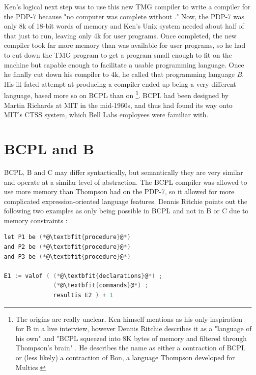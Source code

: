 Ken's logical next step was to use this new TMG compiler to
write a \ftn{} compiler for the PDP-7 because
"no computer was complete without \ftn{}."
Now, the PDP-7 was only 8k of 18-bit words of memory and Ken's Unix system needed
about half of that just to run, leaving only 4k for user programs.
Once completed, the new \ftn{} compiler took far more memory than was available for
user programs, so he had to cut down the TMG program to get a program small enough to
fit on the machine but capable enough to facilitate a usable programming language.
Once he finally cut down his compiler to 4k, he called that programming language \textit{B}.
His ill-fated attempt at producing a \ftn{} compiler ended up being a very different language,
based more so on BCPL than on \ftn{}
\footnote{The origins are really unclear. Ken himself mentions \ftn{} as his only inspiration
for B in a live interview\cite{kernighan_interviews_thompson_2019},
however Dennis Ritchie describes it as a "language of his own" and
"BCPL squeezed into 8K bytes of memory and filtered through Thompson's brain"
\cite{development_of_c_language_ritchie_1996}.
He describes the name as either a contraction of BCPL or (less likely) a contraction
of Bon, a language Thompson developed for Multics.}.
BCPL had been designed by Martin Richards at MIT in the mid-1960s, and thus had found
its way onto MIT's CTSS system, which Bell Labs employees were familiar with.

\section{BCPL and B}

BCPL, B and C may differ syntactically, but semantically they are very similar
and operate at a similar level of abstraction.
The BCPL compiler was allowed to use more memory than Thompson had on the PDP-7,
so it allowed for more complicated expression-oriented language features.
Dennis Ritchie points out the following two examples as only being possible
in BCPL and not in B or C due to memory constraints
\cite{development_of_c_language_ritchie_1996}:

\begin{lstlisting}[language=c,frame=single]
let P1 be (*@\textbfit{procedure}@*)
and P2 be (*@\textbfit{procedure}@*)
and P3 be (*@\textbfit{procedure}@*)

E1 := valof ( (*@\textbfit{declarations}@*) ;
              (*@\textbfit{commands}@*) ;
              resultis E2 ) + 1
\end{lstlisting}

